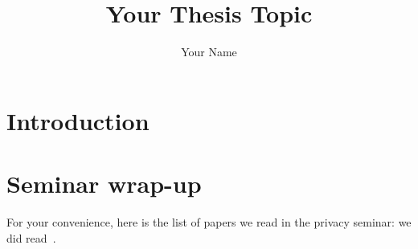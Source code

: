 \documentclass[twocolumn, a4paper, 10pt]{article}
\begin{document}
\title{\Large Your Thesis Topic}

\author{
	Your Name
}

\maketitle

\def\abstractname{{\textbf Abstract}}
\begin{abstract}
{
\bfseries
}
\end{abstract}


\section{Introduction}
\lipsum[1-3]


\section{Seminar wrap-up}
For your convenience, here is the list of papers we read in the privacy seminar: we did read~\cite{
solove2011privacy,
brin1999transparent,
oulasvirta2012long,
chaum1985security,
narayanan2013happened1,
narayanan2013happened2,
chaum1981untraceable,
dingeldine2004tor,
wolinsky2013hang,
juarez2014critical,
Mor2015bloom4,
yekhanin2010private,
camenisch2012electronic,
gervais2014privacy,
bonneau2014mixcoin,
starov2015measuring,
sweeney2002k,
nissenbaum2011contextual,
nissenbaum2004privacy,
narayanan2011link,
dwork2011differential,
homer2008resolving,
kelley2009nutrition,
reznichenko2014private,
kaptein2012rethinking,
afroz2014doppelganger,
chaum2004secret,
acquisti2015privacy,
jagatic2007social,
kang2011self}.


{
	
	
}

\appendix
\end{document}
